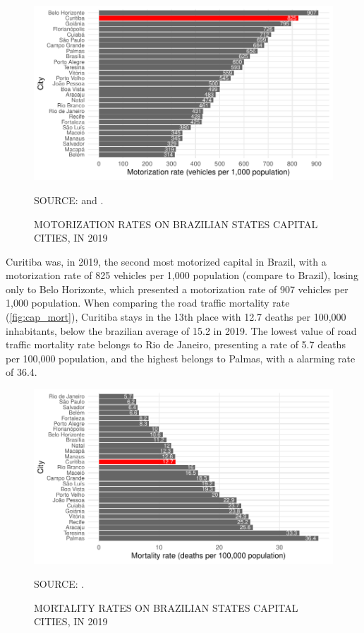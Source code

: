 \begin{figure}[!htbp]
    \centering\footnotesize
    \captionsetup{font=footnotesize}
    \caption{MOTORIZATION RATES ON BRAZILIAN STATES CAPITAL CITIES, IN 2019}
    \includegraphics{fig/cap_motor.pdf}
    \label{fig:cap_motor}
    \par SOURCE: \textcite{MinistryofHealth2020} and \textcite{DENATRAN2020}.
\end{figure}   

Curitiba was, in 2019, the second most motorized capital in Brazil, with a motorization rate of 825 vehicles per 1,000 population (compare to Brazil), losing only to Belo Horizonte, which presented a motorization rate of 907 vehicles per 1,000 population. When comparing the road traffic mortality rate (\autoref{fig:cap_mort}), Curitiba stays in the 13th place with 12.7 deaths per 100,000 inhabitants, below the brazilian average of 15.2 in 2019. The lowest value of road traffic mortality rate belongs to Rio de Janeiro, presenting a rate of 5.7 deaths per 100,000 population, and the highest belongs to Palmas, with a alarming rate of 36.4. 

\begin{figure}[!htbp]
    \centering\footnotesize
    \captionsetup{font=footnotesize}
    \caption{MORTALITY RATES ON BRAZILIAN STATES CAPITAL CITIES, IN 2019}
    \includegraphics{fig/cap_mort.pdf}
    \label{fig:cap_mort}
    \par SOURCE: \textcite{MinistryofHealth2020}.
\end{figure}  

